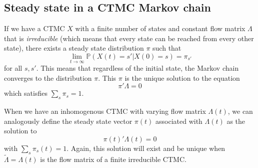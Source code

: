 \documentclass[11pt]{article}
\begin{document}
\subsection{Steady state in a CTMC Markov chain}
If we have a CTMC $X$ with a finite number of states and constant flow matrix $\Lambda$ that is \emph{irreducible} (which means that every state can be reached from every other state), there exists a steady state distribution $\pi$ such that
\[
\lim_{t\to\infty} \mathbb{P}(X(t)=s' | X(0)=s) = \pi_{s'}
\]
for all $s,s'$. This means that regardless of the initial state, the Markov chain converges to the distribution $\pi$. This $\pi$ is the unique solution to the equation
\[
\pi'\Lambda=0
\]
which satisfies $\sum_{s} \pi_s =1$.

When we have an inhomogenous CTMC with varying flow matrix $\Lambda(t)$, we can analogously define the steady state vector $\pi(t)$ associated with $\Lambda(t)$ as the solution to
\[
\pi(t)'\Lambda(t)=0
\]
with $\sum_s \pi_s(t)=1$. Again, this solution will exist and be unique when $\tilde{\Lambda}=\Lambda(t)$ is the flow matrix of a finite irreducible CTMC.
\end{document}
